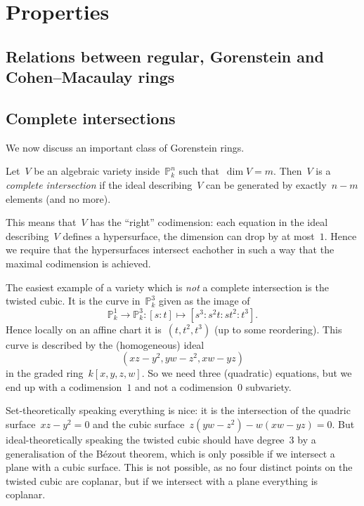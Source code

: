 \documentclass[10pt,a4paper]{article}
\begin{document}
\section{Properties}
\label{section:properties}
\subsection{Relations between regular, Gorenstein and Cohen--Macaulay rings}
\label{subsection:relations}

\subsection{Complete intersections}
\label{subsection:complete-intersections}
We now discuss an important class of Gorenstein rings.
\begin{definition}
  Let~$V$ be an algebraic variety inside~$\mathbb{P}_k^n$ such that~$\dim V=m$. Then~$V$ is a \emph{complete intersection} if the ideal describing~$V$ can be generated by exactly~$n-m$ elements (and no more).
\end{definition}
This means that~$V$ has the ``right'' codimension: each equation in the ideal describing~$V$ defines a hypersurface, the dimension can drop by at most~$1$. Hence we require that the hypersurfaces intersect eachother in such a way that the maximal codimension is achieved.
\begin{example}
\end{example}
\begin{example}
  The easiest example of a variety which is \emph{not} a complete intersection is the twisted cubic. It is the curve in~$\mathbb{P}_k^3$ given as the image of
  \begin{equation}
    \mathbb{P}_k^1\to\mathbb{P}_k^3:[s:t]\mapsto[s^3:s^2t:st^2:t^3].
  \end{equation}
  Hence locally on an affine chart it is~$(t,t^2,t^3)$ (up to some reordering). This curve is described by the (homogeneous) ideal
  \begin{equation}
    (xz-y^2,yw-z^2,xw-yz)
  \end{equation}
  in the graded ring~$k[x,y,z,w]$. So we need three (quadratic) equations, but we end up with a codimension~$1$ and not a codimension~$0$ subvariety.

  Set-theoretically speaking everything is nice: it is the intersection of the quadric surface~$xz-y^2=0$ and the cubic surface~$z(yw-z^2)-w(xw-yz)=0$. But ideal-theoretically speaking the twisted cubic should have degree~$3$ by a generalisation of the B\'ezout theorem, which is only possible if we intersect a plane with a cubic surface. This is not possible, as no four distinct points on the twisted cubic are coplanar, but if we intersect with a plane everything is coplanar.
\end{example}
\end{document}
